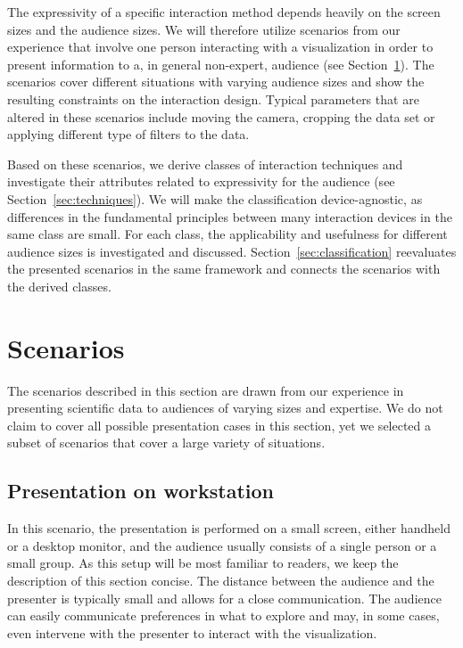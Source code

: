 \documentclass[review,journal]{vgtc}         %
\begin{document}
The expressivity of a specific interaction method depends heavily on the screen sizes and the audience sizes.
We will therefore utilize scenarios from our experience that involve one person interacting with a visualization in order to present information to a, in general non-expert, audience (see Section~\ref{sec:scenario}).
The scenarios cover different situations with varying audience sizes and show the resulting constraints on the interaction design.
Typical parameters that are altered in these scenarios include moving the camera, cropping the data set or applying different type of filters to the data.

Based on these scenarios, we derive classes of interaction techniques and investigate their attributes related to expressivity for the audience (see Section~\ref{sec:techniques}).
We will make the classification device-agnostic, as differences in the fundamental principles between many interaction devices in the same class are small.
For each class, the applicability and usefulness for different audience sizes is investigated and discussed.
Section~\ref{sec:classification} reevaluates the presented scenarios in the same framework and connects the scenarios with the derived classes.

%
%
%
\section{Scenarios} \label{sec:scenario}
The scenarios described in this section are drawn from our experience in presenting scientific data to audiences of varying sizes and expertise.
We do not claim to cover all possible presentation cases in this section, yet we selected a subset of scenarios that cover a large variety of situations.

%
%
\subsection{Presentation on workstation} \label{sec:workstation}
In this scenario, the presentation is performed on a small screen, either handheld or a desktop monitor, and the audience usually consists of a single person or a small group.
As this setup will be most familiar to readers, we keep the description of this section concise.
The distance between the audience and the presenter is typically small and allows for a close communication.
The audience can easily communicate preferences in what to explore and may, in some cases, even intervene with the presenter to interact with the visualization.
\end{document}
